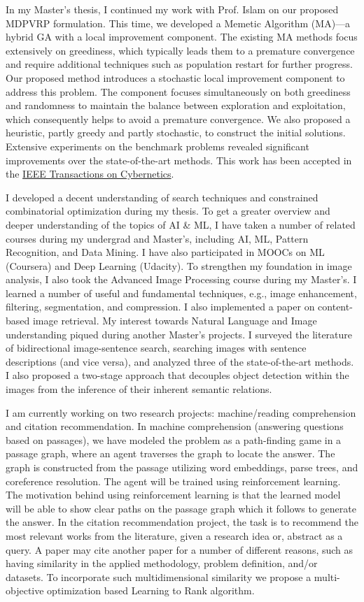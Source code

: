 \documentclass[12pt]{article}
\begin{document}
In my Master's thesis, I continued my work with Prof. Islam on our proposed MDPVRP formulation. This time, we developed a Memetic Algorithm (MA)---a hybrid GA with a local improvement component. The existing MA methods focus extensively on greediness, which typically leads them to a premature convergence and require additional techniques such as population restart for further progress. Our proposed method introduces a stochastic local improvement component to address this problem. The component focuses simultaneously on both greediness and randomness to maintain the balance between exploration and exploitation, which consequently helps to avoid a premature convergence. We also proposed a heuristic, partly greedy and partly stochastic, to construct the initial solutions. Extensive experiments on the benchmark problems revealed significant improvements over the state-of-the-art methods. This work has been accepted in the \href{http://ieeexplore.ieee.org/document/7835722/}{IEEE Transactions on Cybernetics}. 

I developed a decent understanding of search techniques and constrained combinatorial optimization during my thesis. To get a greater overview and deeper understanding of the topics of AI \& ML, I have taken a number of related courses during my undergrad and Master's, including AI, ML, Pattern Recognition, and Data Mining. I have also participated in MOOCs on ML (Coursera) and Deep Learning (Udacity). To strengthen my foundation in image analysis, I also took the Advanced Image Processing course during my Master's. I learned a number of useful and fundamental techniques, e.g., image enhancement, filtering, segmentation, and compression. I also implemented a paper on content-based image retrieval. My interest towards Natural Language and Image understanding piqued during another Master's projects. I surveyed the literature of bidirectional image-sentence search, searching images with sentence descriptions (and vice versa), and analyzed three of the state-of-the-art methods. I also proposed a two-stage approach that decouples object detection within the images from the inference of their inherent semantic relations.

I am currently working on two research projects: machine/reading comprehension and citation recommendation. In machine comprehension (answering questions based on passages), we have modeled the problem as a path-finding game in a passage graph, where an agent traverses the graph to locate the answer. The graph is constructed from the passage utilizing word embeddings, parse trees, and coreference resolution. The agent will be trained using reinforcement learning. The motivation behind using reinforcement learning is that the learned model will be able to show clear paths on the passage graph which it follows to generate the answer. In the citation recommendation project, the task is to recommend the most relevant works from the literature, given a research idea or, abstract as a query. A paper may cite another paper for a number of different reasons, such as having similarity in the applied methodology, problem definition, and/or datasets. To incorporate such multidimensional similarity we propose a multi-objective optimization based Learning to Rank algorithm. 
\end{document}
